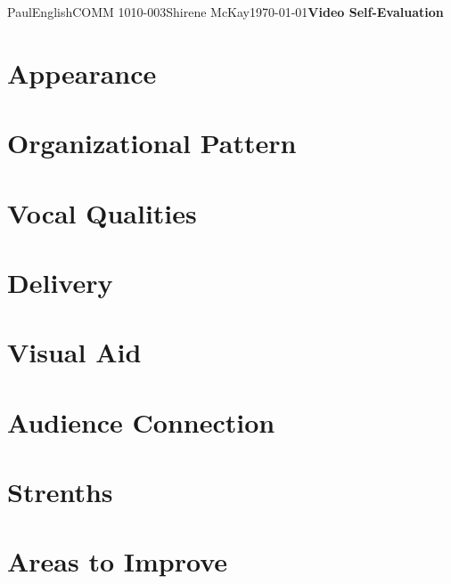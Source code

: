 \documentclass[12pt,letterpaper]{article}
\begin{document}
\begin{mla}{Paul}{English}{COMM 1010-003}{Shirene McKay}{\today}{\textbf{Video Self-Evaluation}}

\section{Appearance}

\section{Organizational Pattern}

\section{Vocal Qualities}

\section{Delivery}

\section{Visual Aid}

\section{Audience Connection}

\section{Strenths}

\section{Areas to Improve}

\end{mla}
\end{document}
